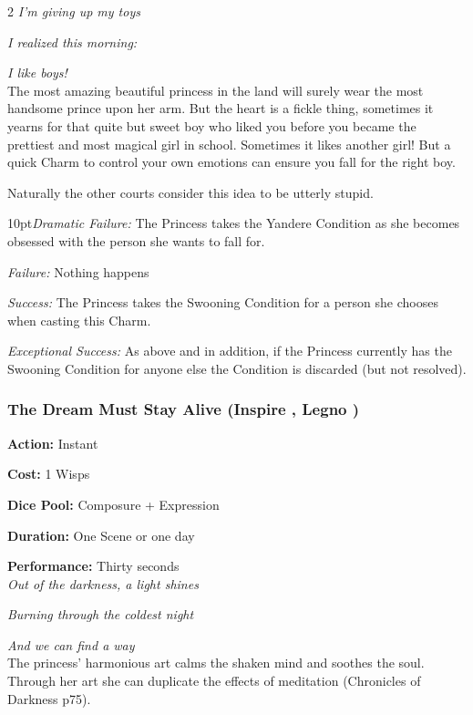 \begin{multicols}{2}
\textit{I'm giving up my toys}

\textit{I realized this morning:}

\textit{I like boys!} \\

\noindent The most amazing beautiful princess in the land will surely wear the most handsome prince upon her arm. But the heart is a fickle thing, sometimes it yearns for that quite but sweet boy who liked you before you became the prettiest and most magical girl in school. Sometimes it likes another girl! But a quick Charm to control your own emotions can ensure you fall for the right boy. 

Naturally the other courts consider this idea to be utterly stupid. 

\begin{myindentpar}{10pt}\emph{Dramatic Failure:} The Princess takes the Yandere Condition as she becomes obsessed with the person she wants to fall for. 
 
 \emph{Failure:} Nothing happens
 
 \emph{Success:} The Princess takes the Swooning Condition for a person she chooses when casting this Charm.
 
 \emph{Exceptional Success:} As above and in addition, if the Princess currently has the Swooning Condition for anyone else the Condition is discarded (but not resolved).
 \end{myindentpar}

 \subsubsection*{The Dream Must Stay Alive (Inspire \textbullet, Legno \textbullet)}

\noindent \textbf{Action:} Instant

\noindent \textbf{Cost:} 1 Wisps

\noindent \textbf{Dice Pool:} Composure + Expression

\noindent \textbf{Duration:} One Scene or one day

\noindent \textbf{Performance:} Thirty seconds \\

\noindent \textit{Out of the darkness, a light shines}

\textit{Burning through the coldest night}

\textit{And we can find a way} \\

\noindent The princess' harmonious art calms the shaken mind and soothes the soul. Through her art she can duplicate the effects of meditation (Chronicles of Darkness p75).  


\end{multicols}
